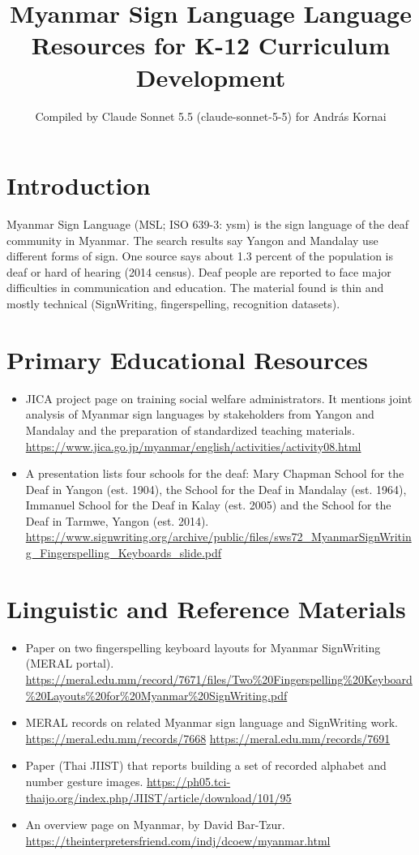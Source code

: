 \documentclass[12pt]{article}
\title{Myanmar Sign Language Language Resources for K-12 Curriculum Development}
\author{Compiled by Claude Sonnet 5.5 (claude-sonnet-5-5) for Andr\'as Kornai}
\date{}
\begin{document}
\maketitle

\section{Introduction}
Myanmar Sign Language (MSL; ISO 639-3: ysm) is the sign language of the deaf community in Myanmar. The search results say Yangon and Mandalay use different forms of sign. One source says about 1.3 percent of the population is deaf or hard of hearing (2014 census). Deaf people are reported to face major difficulties in communication and education. The material found is thin and mostly technical (SignWriting, fingerspelling, recognition datasets).

\section{Primary Educational Resources}
\begin{itemize}
\item JICA project page on training social welfare administrators. It mentions joint analysis of Myanmar sign languages by stakeholders from Yangon and Mandalay and the preparation of standardized teaching materials. \url{https://www.jica.go.jp/myanmar/english/activities/activity08.html}
\item A presentation lists four schools for the deaf: Mary Chapman School for the Deaf in Yangon (est. 1904), the School for the Deaf in Mandalay (est. 1964), Immanuel School for the Deaf in Kalay (est. 2005) and the School for the Deaf in Tarmwe, Yangon (est. 2014). \url{https://www.signwriting.org/archive/public/files/sws72_MyanmarSignWriting_Fingerspelling_Keyboards_slide.pdf}
\end{itemize}

\section{Linguistic and Reference Materials}
\begin{itemize}
\item Paper on two fingerspelling keyboard layouts for Myanmar SignWriting (MERAL portal). \url{https://meral.edu.mm/record/7671/files/Two\%20Fingerspelling\%20Keyboard\%20Layouts\%20for\%20Myanmar\%20SignWriting.pdf}
\item MERAL records on related Myanmar sign language and SignWriting work. \url{https://meral.edu.mm/records/7668} \quad \url{https://meral.edu.mm/records/7691}
\item Paper (Thai JIIST) that reports building a set of recorded alphabet and number gesture images. \url{https://ph05.tci-thaijo.org/index.php/JIIST/article/download/101/95}
\item An overview page on Myanmar, by David Bar-Tzur. \url{https://theinterpretersfriend.com/indj/dcoew/myanmar.html}
\end{itemize}
\end{document}
